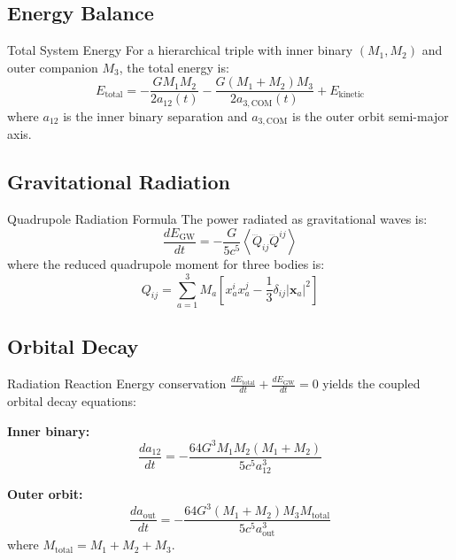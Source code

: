 \documentclass[11pt,a4paper]{article}
\theoremstyle{definition}
\theoremstyle{remark}
\begin{document}
	\subsection{Energy Balance}
	
	Total System Energy\label{prop:total_energy}
		For a hierarchical triple with inner binary $(M_1, M_2)$ and outer companion $M_3$, the total energy is:
		\begin{equation}\label{eq:total_energy}
			E_{\text{total}} = -\frac{GM_1M_2}{2a_{12}(t)} - \frac{G(M_1+M_2)M_3}{2a_{3,\text{COM}}(t)} + E_{\text{kinetic}}
		\end{equation}
		where $a_{12}$ is the inner binary separation and $a_{3,\text{COM}}$ is the outer orbit semi-major axis.
	
	\subsection{Gravitational Radiation}
	
	Quadrupole Radiation Formula\label{thm:quadrupole}
		The power radiated as gravitational waves is:
		\begin{equation}\label{eq:power_radiated}
			\frac{dE_{\text{GW}}}{dt} = -\frac{G}{5c^5}\left\langle \dddot{Q}_{ij}\dddot{Q}^{ij}\right\rangle
		\end{equation}
		where the reduced quadrupole moment for three bodies is:
		\begin{equation}\label{eq:quadrupole_moment}
			Q_{ij} = \sum_{a=1}^3 M_a\left[x_a^i x_a^j - \frac{1}{3}\delta_{ij}|\mathbf{x}_a|^2\right]
		\end{equation}
	
	\subsection{Orbital Decay}
	
	Radiation Reaction\label{thm:radiation_reaction}
		Energy conservation $\frac{dE_{\text{total}}}{dt} + \frac{dE_{\text{GW}}}{dt} = 0$ yields the coupled orbital decay equations:
		
		\textbf{Inner binary:}
		\begin{equation}\label{eq:decay_inner}
			\boxed{\frac{da_{12}}{dt} = -\frac{64G^3M_1M_2(M_1+M_2)}{5c^5a_{12}^3}}
		\end{equation}
		
		\textbf{Outer orbit:}
		\begin{equation}\label{eq:decay_outer}
			\boxed{\frac{da_{\text{out}}}{dt} = -\frac{64G^3(M_1+M_2)M_3M_{\text{total}}}{5c^5a_{\text{out}}^3}}
		\end{equation}
		where $M_{\text{total}} = M_1 + M_2 + M_3$.
	
\end{document}
